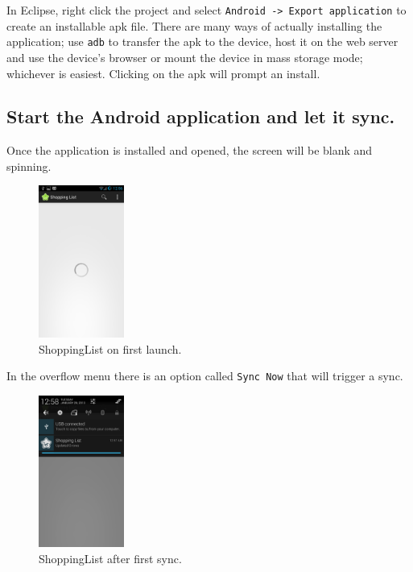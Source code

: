 \documentclass[journal]{IEEEtran}
\begin{document}
In Eclipse, right click the project and select \texttt{Android -> Export application} to create an installable apk file. There are many ways of actually installing the application; use \texttt{adb} to transfer the apk to the device, host it on the web server and use the device's browser or mount the device in mass storage mode; whichever is easiest. Clicking on the apk will prompt an install.

\subsection{Start the Android application and let it sync.}  \label{sec:}

Once the application is installed and opened, the screen will be blank and spinning. 


\begin{figure}[h!]
\centering
\includegraphics[width=0.25\textwidth]{images/new.png}
\caption{ShoppingList on first launch.}
\label{fig:first_launch}
\end{figure}

In the overflow menu there is an option called \texttt{Sync Now} that will trigger a sync.


\begin{figure}[h!]
\centering
\includegraphics[width=0.25\textwidth]{images/dl.png}
\caption{ShoppingList after first sync.}
\label{fig:first_sync}
\end{figure}
\end{document}
